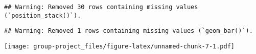 \documentclass[
]{article}
\newenvironment{Shaded}{\begin{snugshade}}{\end{snugshade}}
\newcommand{\DecValTok}[1]{\textcolor[rgb]{0.00,0.00,0.81}{#1}}
\newcommand{\FunctionTok}[1]{\textcolor[rgb]{0.00,0.00,0.00}{#1}}
\newcommand{\NormalTok}[1]{#1}
\newcommand{\OtherTok}[1]{\textcolor[rgb]{0.56,0.35,0.01}{#1}}
\newcommand{\SpecialCharTok}[1]{\textcolor[rgb]{0.00,0.00,0.00}{#1}}
\newcommand{\StringTok}[1]{\textcolor[rgb]{0.31,0.60,0.02}{#1}}
\begin{document}
\begin{verbatim}
## Warning: Removed 30 rows containing missing values (`position_stack()`).
\end{verbatim}

\begin{verbatim}
## Warning: Removed 1 rows containing missing values (`geom_bar()`).
\end{verbatim}

\texttt{[image: group-project\_files/figure-latex/unnamed-chunk-7-1.pdf]}

\begin{Shaded}
\end{Shaded}
\end{document}
